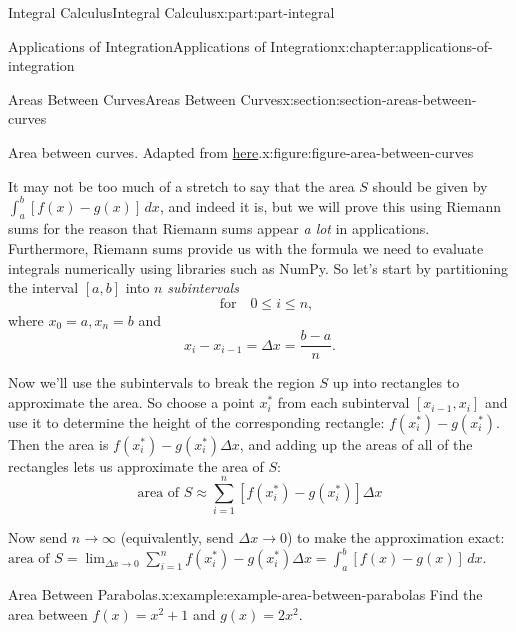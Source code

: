 \documentclass[twoside,10pt,]{tufte-book}
\numberwithin{equation}{part}
\begin{document}
\begin{partptx}{Integral Calculus}{}{Integral Calculus}{}{}{x:part:part-integral}
\begin{chapterptx}{Applications of Integration}{}{Applications of Integration}{}{}{x:chapter:applications-of-integration}
\begin{sectionptx}{Areas Between Curves}{}{Areas Between Curves}{}{}{x:section:section-areas-between-curves}
\begin{figureptx}{Area between curves. Adapted from \href{https://tex.stackexchange.com/questions/164773/graphics-area-between-curves}{here}\protect\footnotemark{}.}{x:figure:figure-area-between-curves}{}
\begin{image}{0.125}{0.75}{0.125}
{
}%
\end{image}%
\tcblower
\end{figureptx}%
%
It may not be too much of a stretch to say that the area \(S\) should be given by \(\int_{a}^{b}[f(x) - g(x)]\,dx\), and indeed it is, but we will prove this using Riemann sums for the reason that Riemann sums appear \emph{a lot} in applications. Furthermore, Riemann sums provide us with the formula we need to evaluate integrals numerically using libraries such as NumPy. So let's start by partitioning the interval \([a,b]\) into \(n\) \emph{subintervals}%
\begin{equation*}
[x_{i-1},x_{i}]\quad\text{for}\quad 0\leq i\leq n,
\end{equation*}
where \(x_{0} = a, x_{n} = b\) and%
\begin{equation*}
x_{i} - x_{i-1} = \Delta x = \frac{b-a}{n}.
\end{equation*}
%
\par
Now we'll use the subintervals to break the region \(S\) up into rectangles to approximate the area. So choose a point \(x_{i}^{*}\) from each subinterval \([x_{i-1}, x_{i}]\) and use it to determine the height of the corresponding rectangle: \(f(x_{i}^{*}) - g(x_{i}^{*})\). Then the area is \(f(x_{i}^{*}) - g(x_{i}^{*})\Delta x\), and adding up the areas of all of the rectangles lets us approximate the area of \(S\):%
\begin{equation}
\text{area of }S \approx \sum_{i=1}^{n}[f(x_{i}^{*}) - g(x_{i}^{*})]\Delta x\label{x:men:equation-area-between-curves-approximation}
\end{equation}
%
\par
Now send \(n\to\infty\) (equivalently, send \(\Delta x\to 0\)) to make the approximation exact: \(\text{area of }S = \lim_{\Delta x\to0}\sum_{i=1}^{n}f(x_{i}^{*}) - g(x_{i}^{*})\Delta x = \int_{a}^{b}[f(x) - g(x)]\,dx.\)%
\begin{example}{Area Between Parabolas.}{x:example:example-area-between-parabolas}%
Find the area between \(f(x) = x^{2} + 1\) and \(g(x) = 2x^{2}\).%
\par\smallskip%

\end{example}
\end{sectionptx}
\end{chapterptx}
\end{partptx}
\end{document}
